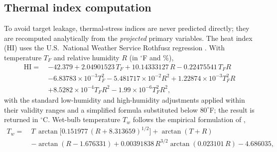 \documentclass[pdflatex,sn-basic,lineno]{sn-jnl}
\newcommand{\degC}{\ensuremath{^{\circ}\mathrm{C}}}
\begin{document}
\subsection{Thermal index computation}\label{sec:indices}
To avoid target leakage, thermal-stress indices are never predicted directly;
they are recomputed analytically from the \emph{projected} primary variables.
The heat index (HI) uses the U.S.\ National Weather Service Rothfusz regression
\citep{rothfusz1990}. With temperature $T_F$ and relative humidity $R$ (in
$^{\circ}$F and \%),
\begin{align}
\mathrm{HI} =\ & -42.379 + 2.04901523\,T_F + 10.14333127\,R
     - 0.22475541\,T_F R \nonumber\\
   & - 6.83783\!\times\!10^{-3} T_F^{2}
     - 5.481717\!\times\!10^{-2} R^{2}
     + 1.22874\!\times\!10^{-3} T_F^{2} R \nonumber\\
   & + 8.5282\!\times\!10^{-4} T_F R^{2}
     - 1.99\!\times\!10^{-6} T_F^{2} R^{2},
\label{eq:hi}
\end{align}
with the standard low-humidity and high-humidity adjustments applied within
their validity ranges and a simplified formula substituted below $80^{\circ}$F;
the result is returned in $\degC$. Wet-bulb temperature $T_w$ follows the
empirical formulation of \citet{stull2011},
\begin{align}
T_w =\ & T\,\arctan\!\big[0.151977\,(R+8.313659)^{1/2}\big]
       + \arctan(T+R) \nonumber\\
     & - \arctan(R-1.676331)
       + 0.00391838\,R^{3/2}\arctan(0.023101\,R) - 4.686035,
\label{eq:wetbulb}
\end{align}
\end{document}
